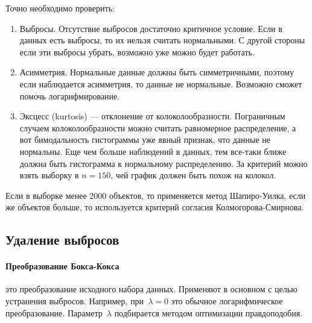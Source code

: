 \documentclass[a4paper, oneside]{book}
\let\oldmarginpar\marginpar
\renewcommand\marginpar[1]{\-\oldmarginpar[\raggedleft\footnotesize #1]%
{\raggedright\footnotesize #1}}
\begin{document}
Точно необходимо проверить:
\begin{enumerate}
    \item Выбросы. Отсутствие выбросов достаточно критичное условие. Если в данных есть выбросы, то их нельзя считать нормальными. С другой стороны если эти выбросы убрать, возможно уже можно будет работать.

    
    \item Асимметрия.\marginnote{ \[A = \frac{\mu_3}{\sigma^3}\]}
        Нормальные данные должны быть симметричными, поэтому если наблюдается асимметрия, то данные не нормальные. Возможно сможет помочь логарифмирование. 

    \item Эксцесс (kurtosis) --- отклонение от колоколообразности.
        \marginnote{ \[\gamma_2 = \frac{\mu_4}{\sigma^4} - 3\]}
        Пограничным случаем колоколообразности можно считать равномерное распределение, а вот бимодальность гистограммы уже явный признак, что данные не нормальны. Еще чем больше наблюдений в данных, тем все-таки ближе должна быть гистограмма к нормальному распределению. За критерий можно взять выборку в $n=150$, чей график должен быть похож на колокол.
\end{enumerate}

Если в выборке менее 2000 объектов, то применяется метод Шапиро-Уилка, если же объектов больше, то используется критерий согласия Колмогорова-Смирнова.

\subsection{Удаление выбросов}
\paragraph{Преобразование Бокса-Кокса} 
\marginpar{
    \begin{equation}
        \label{eq:box-cox}
        x_{i,\lambda} = 
        \begin{cases}
            \frac{x_i^\lambda - 1}{\lambda} & \text{если } \lambda \ne 0, \\
            \log(x_i) & \text{если } \lambda = 0.
        \end{cases}
    \end{equation}
}
это преобразование исходного набора
данных. Применяют в основном с целью устранения выбросов. Например,
при~$\lambda = 0$ это обычное логарифмическое преобразование.
Параметр~$\lambda$ подбирается методом оптимизации правдоподобия.
\end{document}

